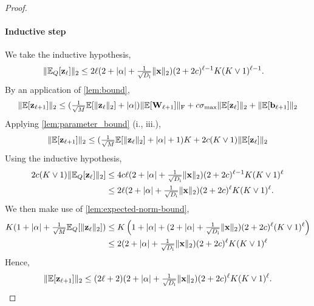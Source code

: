 \documentclass[twoside]{article}
\renewcommand{\ss}[1]{_{\text{#1}}}
\newcommand{\vb}{\mathbf{b}}
\newcommand{\vx}{\mathbf{x}}
\newcommand{\vz}{\mathbf{z}}
\newcommand{\mW}{\mathbf{W}}
\newcommand{\E}{\mathbb{E}}
\renewcommand{\ss}[1]{_{\text{#1}}}        %
\DeclarePairedDelimiter\norm{\|}{\|}             %
\DeclarePairedDelimiter\abs{|}{|}                %
\theoremstyle{theoremstyle}
\begin{document}
\begin{proof}
\paragraph{Inductive step}
We take the inductive hypothesis, \begin{align}
    \norm{\E_Q[\vz_\ell]}_2 &\le 2\ell (2 + \abs{\alpha} + \tfrac1{\sqrt{D\ss{i}}}\norm{\vx}_2)(2 + 2c)^{\ell-1}K(K \lor 1)^{\ell-1}.
\end{align}
By an application of \cref{lem:bound}, 
\begin{equation}
    \norm{\E[\vz_{\ell+1}]}_2 \le (\tfrac1{\sqrt{M}}\E[\norm{\vz_{\ell}}_2] + \abs{\alpha})\norm{\E[\mW_{\ell+1}]}\ss{F} + c \sigma\ss{max} \norm{\E[\vz_{\ell}]}_2 + \norm{\E[\vb_{\ell+1}]}_2
\end{equation}
Applying
\cref{lem:parameter_bound} (i., iii.), 
\begin{equation}
   \norm{\E[\vz_{\ell+1}]}_2 \le (\tfrac1{\sqrt{M}}\E[\norm{\vz_{\ell}}_2] + \abs{\alpha} + 1)K + 2c (K\lor 1) \norm{\E[\vz_{\ell}]}_2 
\end{equation}
Using the inductive hypothesis, 
\begin{align}
    2c(K \lor 1)\norm{\E_Q[\vz_\ell]}_2] &\le 4c\ell (2 + \abs{\alpha} + \tfrac1{\sqrt{D\ss{i}}}\norm{\vx}_2)(2 + 2c)^{\ell-1}K(K \lor 1)^{\ell} \\
    & \le 2\ell (2 + \abs{\alpha} + \tfrac1{\sqrt{D\ss{i}}}\norm{\vx}_2)(2 + 2c)^{\ell}K(K \lor 1)^{\ell}.
\end{align}
We then make use of \cref{lem:expected-norm-bound},
\begin{align}
  K(1 + |\alpha| + \tfrac1{\sqrt{M}}\E_Q[\norm{\vz_\ell}_2]) &\le K\left(1 + |\alpha| + (2 + \abs{\alpha} + \tfrac1{\sqrt{D\ss{i}}}\norm{\vx}_2)(2 + 2c)^\ell(K \lor 1)^\ell\right) \\
  & \le  2(2 + \abs{\alpha} + \tfrac1{\sqrt{D\ss{i}}}\norm{\vx}_2)(2 + 2c)^\ell K(K \lor 1)^\ell
\end{align}
Hence,
\begin{equation*}
   \norm{\E[\vz_{\ell+1}]}_2 \le (2\ell+2)(2 + \abs{\alpha} + \tfrac1{\sqrt{D\ss{i}}}\norm{\vx}_2)(2 + 2c)^\ell K(K \lor 1)^\ell. \qedhere
\end{equation*}
\end{proof}
\end{document}
